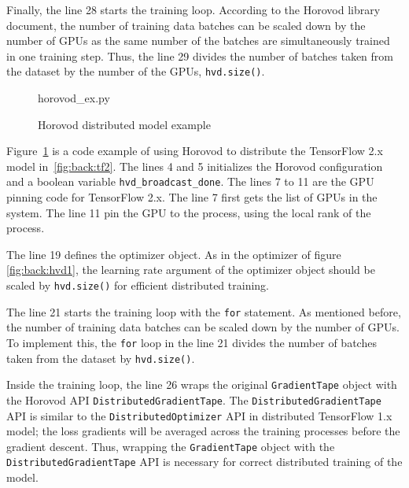 Finally, the line 28 starts the training loop.
According to the Horovod library document, the number of training data
batches can be scaled down by the number of GPUs as the same number of
the batches are simultaneously trained in one training step.
Thus, the line 29 divides the number of batches taken from the dataset
by the number of the GPUs, {\tt hvd.size()}.


\begin{figure}[ht!]
 
{horovod_ex.py}
  \caption{Horovod distributed model example}
\label{fig:back:hvd2} 
\end{figure}

Figure~\ref{fig:back:hvd2} is a code example of using Horovod to distribute
the TensorFlow 2.x model in~\ref{fig:back:tf2}.
The lines 4 and 5 initializes the Horovod configuration and a boolean variable
{\tt hvd\_broadcast\_done}.
The lines 7 to 11 are the GPU pinning code for TensorFlow 2.x. 
The line 7 first gets the list of GPUs in the system.
The line 11 pin the GPU to the process, using the local rank of the process.

The line 19 defines the optimizer object.
As in the optimizer of figure \ref{fig:back:hvd1}, 
the learning rate argument of the optimizer object 
should be scaled by {\tt hvd.size()} for efficient distributed training. 

The line 21 starts the training loop with the {\tt for} statement.
As mentioned before, the number of training data batches can be
scaled down by the number of GPUs.
To implement this, the {\tt for} loop in the line 21
divides the number of batches taken from the dataset by {\tt hvd.size()}.

Inside the training loop,
the line 26 wraps the original {\tt GradientTape} object with the Horovod API  
{\tt DistributedGradientTape}.
The {\tt DistributedGradientTape} API is similar
to the {\tt DistributedOptimizer} API in distributed TensorFlow 1.x model; 
the loss gradients will be averaged across the training processes 
before the gradient descent.
Thus, wrapping the {\tt GradientTape} object with the 
{\tt DistributedGradientTape} API is necessary for correct distributed training
of the model.

